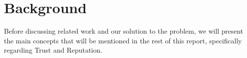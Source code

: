 \section{Background}
\label{sec:Background}



Before discussing related work and our solution to the problem, we will present the main concepts that  will be mentioned in the rest of this report, specifically regarding Trust and Reputation.

